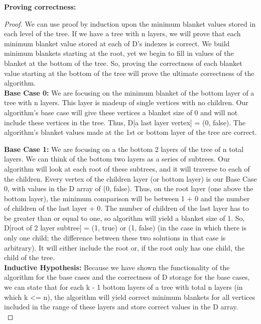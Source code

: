 \documentclass[11pt, solution, letterpaper]{format}
\begin{document}
\textbf{Proving correctness:}
\begin{proof} We can use proof by induction upon the minimum blanket values stored in each level of the tree. If we have a tree with n layers, we will prove that each minimum blanket value stored at each of D's indexes is correct. We build minimum blankets starting at the root, yet we begin to fill in values of the blanket at the bottom of the tree. 
So, proving the correctness of each blanket value starting at the bottom of the tree  will prove the ultimate correctness of the algorithm. \\


\textbf{Base Case 0:} We are focusing on the minimum blanket of the bottom layer of a tree with n layers. This layer is madeup of single vertices  with no children. Our algorithm's base case will give these vertices a blanket size of 0 and will not include these vertices in the tree. Thus, D[a last layer vertex] = (0, false). The algorithm's blanket values made at the 1st or bottom layer of the tree are correct.

\textbf{Base Case 1:} We are focusing on a the bottom 2 layers of the tree of n total layers. We can think of the bottom two layers as a series of subtrees. Our algorithm will look at each root of these subtrees, and it will traverse to each of the children. Every vertex of the children layer (or bottom layer) is our Base Case 0, with values in the D array of (0, false). Thus, on the root layer (one above the bottom layer), the minimum comparison will be between 1 + 0 and the number of children of the last layer + 0. The number of children of the last layer has to be greater than or equal to one, so algorithm will yield a blanket size of 1. So, D[root of 2 layer subtree] = (1, true) or (1, false) (in the case in which there is only one child; the difference between these two solutions in that case is arbitrary).  It will either include the root or, if the root only has one child, the child of the tree. \\

\textbf{Inductive Hypothesis:} Because we have shown the functionality of the algorithm for the base cases and the correctness of D storage for the base cases, we can state that for each k - 1 bottom layers of a tree with total n layers (in which k <= n), the algorithm will yield correct minimum blankets for all vertices included in the range of these layers and store correct values in the D array.\\


\end{proof}
\end{document}
